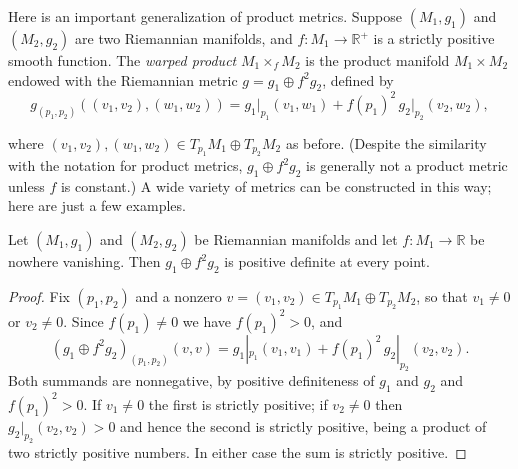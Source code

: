 Here is an important generalization of product metrics. Suppose $(M_1, g_1)$ and $(M_2, g_2)$ are two Riemannian manifolds, and $f : M_1 \to \mathbb{R}^+$ is a strictly positive smooth function. The \emph{warped product} $M_1 \times_f M_2$ is the product manifold $M_1 \times M_2$ endowed with the Riemannian metric $g = g_1 \oplus f^2 g_2$, defined by
\begin{equation}
g_{(p_1,p_2)}((v_1, v_2), (w_1, w_2)) = g_1\big|_{p_1}(v_1, w_1) + f(p_1)^2 \, g_2\big|_{p_2}(v_2, w_2),
\end{equation}

where $(v_1, v_2), (w_1, w_2) \in T_{p_1}M_1 \oplus T_{p_2}M_2$ as before. (Despite the similarity with the notation for product metrics, $g_1 \oplus f^2 g_2$ is generally not a product metric unless $f$ is constant.) A wide variety of metrics can be constructed in this way; here are just a few examples.

\begin{lemma}
\label{lem:warped-product-form-positive-definite}
\leanok
{}
Let $(M_1,g_1)$ and $(M_2,g_2)$ be Riemannian manifolds and let $f : M_1 \to \mathbb{R}$ be nowhere vanishing. Then $g_1 \oplus f^2 g_2$ is positive definite at every point.
\end{lemma}

\begin{proof}
\leanok
{}
Fix $(p_1,p_2)$ and a nonzero $v = (v_1,v_2) \in T_{p_1}M_1 \oplus T_{p_2}M_2$, so that $v_1 \neq 0$ or $v_2 \neq 0$. Since $f(p_1) \neq 0$ we have $f(p_1)^2 > 0$, and
\[
(g_1 \oplus f^2 g_2)_{(p_1,p_2)}(v,v) = g_1|_{p_1}(v_1,v_1) + f(p_1)^2\, g_2|_{p_2}(v_2,v_2).
\]
Both summands are nonnegative, by positive definiteness of $g_1$ and $g_2$ and $f(p_1)^2 > 0$. If $v_1 \neq 0$ the first is strictly positive; if $v_2 \neq 0$ then $g_2|_{p_2}(v_2,v_2) > 0$ and hence the second is strictly positive, being a product of two strictly positive numbers. In either case the sum is strictly positive.
\end{proof}


